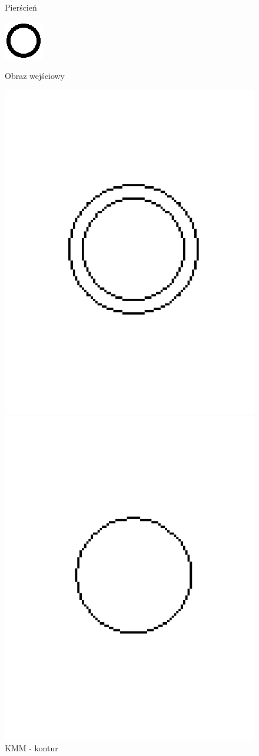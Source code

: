 \documentclass[11pt]{article}
\begin{document}
\begin{figure}[!ht] 
  \caption{Pierścień}
  \label{ fig7} 
  \begin{minipage}[b]{0.5\linewidth}
    \centering
    \includegraphics[width=.5\linewidth]{../images/ring} 
    \caption{Obraz wejściowy} 
    \vspace{4ex}
  \end{minipage}%
  \begin{minipage}[b]{0.5\linewidth}
    \centering
    \includegraphics[width=.5\linewidth]{../samples/ring_kmm_contour} 
    \caption{KMM - kontur} 
    \vspace{4ex}
  \end{minipage} 
  \begin{minipage}[b]{0.5\linewidth}
    \centering
    \includegraphics[width=.5\linewidth]{../samples/ring_kmm} 

\end{minipage}
\end{figure}
\end{document}
